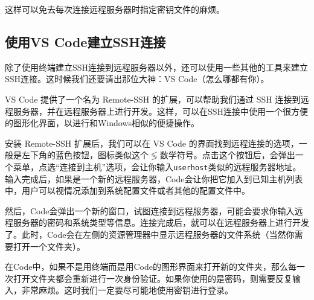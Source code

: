 \documentclass[../main.tex]{subfiles}
\begin{document}
这样可以免去每次连接远程服务器时指定密钥文件的麻烦。

\subsection{使用VS Code建立SSH连接}

除了使用终端建立SSH连接到远程服务器以外，还可以使用一些其他的工具来建立SSH连接。这时候我们还要请出那位大神：VS Code（怎么哪都有你）。

VS Code 提供了一个名为 Remote-SSH 的扩展，可以帮助我们通过 SSH 连接到远程服务器，并在远程服务器上进行开发。这样，可以在SSH连接中使用一个很方便的图形化界面，以进行和Windows相似的便捷操作。

安装 Remote-SSH 扩展后，我们可以在 VS Code 的界面找到远程连接的选项，一般是左下角的蓝色按钮，图标类似这个$\lessgtr$数学符号。点击这个按钮后，会弹出一个菜单，点选“连接到主机”选项，会让你输入\texttt{user\@ host}类似的远程服务器地址。输入完成后，如果是一个新的远程服务器，Code会让你把它加入到已知主机列表中，用户可以视情况添加到系统配置文件或者其他的配置文件中。

然后，Code会弹出一个新的窗口，试图连接到远程服务器，可能会要求你输入远程服务器的密码和系统类型等信息。连接完成后，就可以在远程服务器上进行开发了。此时，Code会在左侧的资源管理器中显示远程服务器的文件系统（当然你需要打开一个文件夹）。

在Code中，如果不是用终端而是用Code的图形界面来打开新的文件夹，那么每一次打开文件夹都会重新进行一次身份验证。如果你使用的是密码，则需要反复输入，非常麻烦。这时我们一定要尽可能地使用密钥进行登录。
\end{document}
